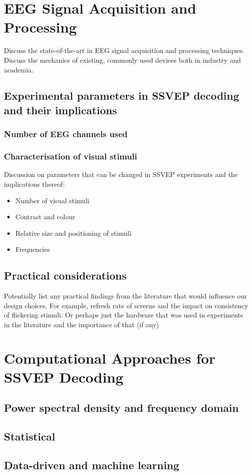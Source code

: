 \section{EEG Signal Acquisition and Processing}
Discuss the state-of-the-art in EEG signal acquisition and processing techniques. Discuss the mechanics of existing, commonly used devices both in industry and academia.
\subsection{Experimental parameters in SSVEP decoding and their implications}
\subsubsection{Number of EEG channels used}
\subsubsection{Characterisation of visual stimuli}
Discussion on parameters that can be changed in SSVEP experiments and the implications thereof:
\begin{itemize}
    \item Number of visual stimuli
    \item Contrast and colour
    \item Relative size and positioning of stimuli
    \item Frequencies
\end{itemize}

\subsection{Practical considerations}
Potentially list any practical findings from the literature that would influence our design choices. For example, refresh rate of screens and the impact on consistency of flickering stimuli. Or perhaps just the hardware that was used in experiments in the literature and the importance of that (if any)

\section{Computational Approaches for SSVEP Decoding}
\subsection{Power spectral density and frequency domain}
\subsection{Statistical}
\subsection{Data-driven and machine learning}